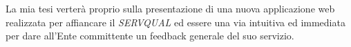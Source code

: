 La mia tesi verterà proprio sulla presentazione di una nuova applicazione web
realizzata per affiancare il \emph{SERVQUAL} ed essere una via intuitiva ed
immediata per dare all’Ente committente un feedback generale del suo servizio.




